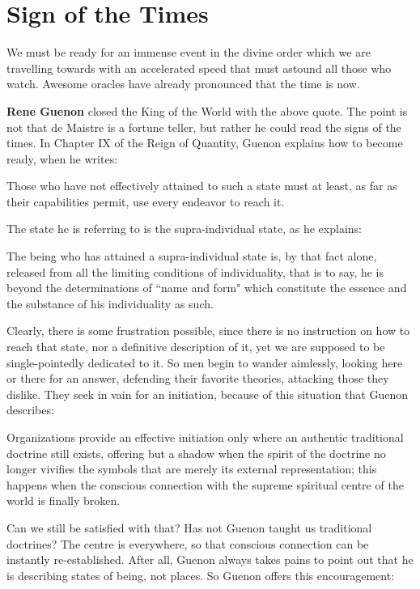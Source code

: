 \section{Sign of the Times}

\begin{quotex}
We must be ready for an immense event in the divine order which we are travelling towards with an accelerated speed that must astound all those who watch. Awesome oracles have already pronounced that the time is now. 

\end{quotex}
\textbf{Rene Guenon} closed the King of the World with the above quote. The point is not that de Maistre is a fortune teller, but rather he could read the signs of the times. In Chapter IX of the Reign of Quantity, Guenon explains how to become ready, when he writes:

\begin{quotex}
Those who have not effectively attained to such a state must at least, as far as their capabilities permit, use every endeavor to reach it. 

\end{quotex}
The state he is referring to is the supra-individual state, as he explains:

\begin{quotex}
The being who has attained a supra-individual state is, by that fact alone, released from all the limiting conditions of individuality, that is to say, he is beyond the determinations of ``name and form" which constitute the essence and the substance of his individuality as such. 

\end{quotex}
Clearly, there is some frustration possible, since there is no instruction on how to reach that state, nor a definitive description of it, yet we are supposed to be single-pointedly dedicated to it. So men begin to wander aimlessly, looking here or there for an answer, defending their favorite theories, attacking those they dislike. They seek in vain for an initiation, because of this situation that Guenon describes:

\begin{quotex}
Organizations provide an effective initiation only where an authentic traditional doctrine still exists, offering but a shadow when the spirit of the doctrine no longer vivifies the symbols that are merely its external representation; this happens when the conscious connection with the supreme spiritual centre of the world is finally broken. 

\end{quotex}
Can we still be satisfied with that? Has not Guenon taught us traditional doctrines? The centre is everywhere, so that conscious connection can be instantly re-established. After all, Guenon always takes pains to point out that he is describing states of being, not places. So Guenon offers this encouragement:

